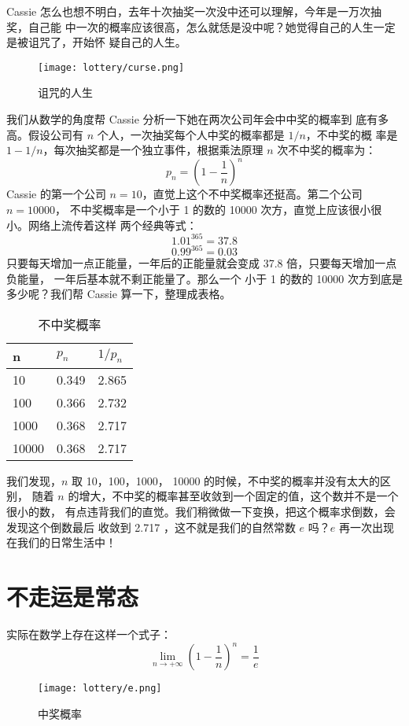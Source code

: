 Cassie 怎么也想不明白，去年十次抽奖一次没中还可以理解，今年是一万次抽奖，自己能
中一次的概率应该很高，怎么就恁是没中呢？她觉得自己的人生一定是被诅咒了，开始怀
疑自己的人生。
\begin{figure}[H]
\centering
\texttt{[image: lottery/curse.png]}
\caption{诅咒的人生}
\centering
\end{figure}

我们从数学的角度帮 Cassie 分析一下她在两次公司年会中中奖的概率到
底有多高。假设公司有 $n$ 个人，一次抽奖每个人中奖的概率都是 $1/n$，不中奖的概
率是 $1-1/n$，每次抽奖都是一个独立事件，根据乘法原理 $n$ 次不中奖的概率为：
 $$ p_n = (1- \frac1n)^n $$
Cassie 的第一个公司 $n=10$，直觉上这个不中奖概率还挺高。第二个公司$ n=10000$，
不中奖概率是一个小于 1 的数的 10000 次方，直觉上应该很小很小。网络上流传着这样
两个经典等式：
$$ 1.01^{365} = 37.8 $$
$$ 0.99^{365} = 0.03 $$
只要每天增加一点正能量，一年后的正能量就会变成 37.8 倍，只要每天增加一点负能量，
一年后基本就不剩正能量了。那么一个 小于 1 的数的 10000 次方到底是多少呢？我们帮
 Cassie 算一下，整理成表格。
\begin{table}[htbp]
\centering
\caption{不中奖概率}
\begin{tabular}{|l|l|l|}
\hline
     n     & $ p_n $ & $ 1/p_n $ \\ \hline
     10    & 0.349   & 2.865     \\ \hline
     100   & 0.366   & 2.732     \\ \hline
     1000  & 0.368   & 2.717     \\ \hline
     10000 & 0.368   & 2.717     \\ \hline
\end{tabular}
\end{table}

我们发现，$n$ 取 10，100，1000， 10000 的时候，不中奖的概率并没有太大的区别，
随着 $n$ 的增大，不中奖的概率甚至收敛到一个固定的值，这个数并不是一个很小的数，
有点违背我们的直觉。我们稍微做一下变换，把这个概率求倒数，会发现这个倒数最后
收敛到 2.717 ，这不就是我们的自然常数 $e$ 吗？$e$ 再一次出现在我们的日常生活中！

\section{不走运是常态}

实际在数学上存在这样一个式子：
$$ \lim_{n \rightarrow +\infty } (1 - \frac1n)^n = \frac1e $$

\begin{figure}[htbp]
\centering
\texttt{[image: lottery/e.png]}
\caption{中奖概率}
\centering
\end{figure}

